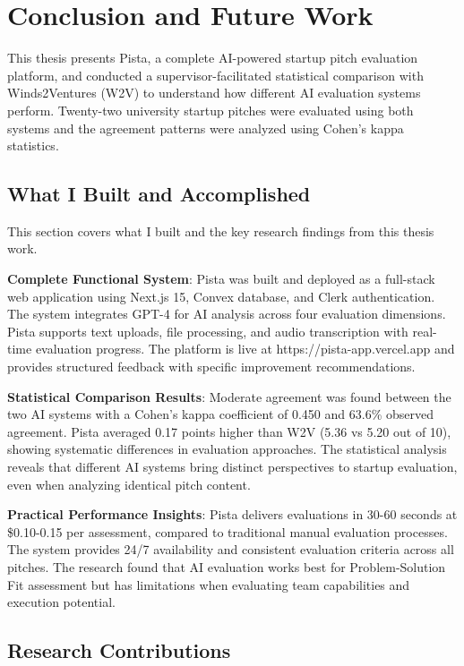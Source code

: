 \chapter{Conclusion and Future Work}
\label{ch:conclusion}

This thesis presents Pista, a complete AI-powered startup pitch evaluation platform, and conducted a supervisor-facilitated statistical comparison with Winds2Ventures (W2V) to understand how different AI evaluation systems perform. Twenty-two university startup pitches were evaluated using both systems and the agreement patterns were analyzed using Cohen's kappa statistics.

\section{What I Built and Accomplished}
\label{sec:accomplishments}

This section covers what I built and the key research findings from this thesis work.

\textbf{Complete Functional System}: Pista was built and deployed as a full-stack web application using Next.js 15, Convex database, and Clerk authentication. The system integrates GPT-4 for AI analysis across four evaluation dimensions. Pista supports text uploads, file processing, and audio transcription with real-time evaluation progress. The platform is live at https://pista-app.vercel.app and provides structured feedback with specific improvement recommendations.

\textbf{Statistical Comparison Results}: Moderate agreement was found between the two AI systems with a Cohen's kappa coefficient of 0.450 and 63.6\% observed agreement. Pista averaged 0.17 points higher than W2V (5.36 vs 5.20 out of 10), showing systematic differences in evaluation approaches. The statistical analysis reveals that different AI systems bring distinct perspectives to startup evaluation, even when analyzing identical pitch content.

\textbf{Practical Performance Insights}: Pista delivers evaluations in 30-60 seconds at \$0.10-0.15 per assessment, compared to traditional manual evaluation processes. The system provides 24/7 availability and consistent evaluation criteria across all pitches. The research found that AI evaluation works best for Problem-Solution Fit assessment but has limitations when evaluating team capabilities and execution potential.

\section{Research Contributions}
\label{sec:contributions}

